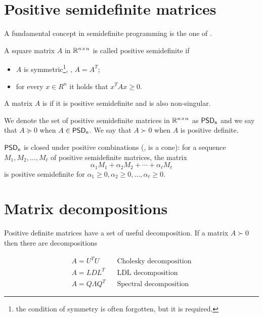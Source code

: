 \documentclass[a4paper,twoside,justified]{tufte-handout}
\begin{document}
 

\section{Positive semidefinite matrices}

A fundamental concept in semidefinite programming is the one of
. 
\begin{definition}
  A square matrix $A$ in $ \mathbb{R}^{n\times n} $ is called positive
  semidefinite if 
  \begin{itemize}
    \item $A$ is symmetric\footnote{the condition of symmetry is often
      forgotten, but it is required.}, \ie, $ A=A^{T} $;
    \item for every $ x\in R^{n} $ it holds that $ x^{T} A x \geq 0 $.
  \end{itemize}
  A matrix $ A $ is  if it is
  positive semidefinite and is also non-singular.
\end{definition}
We denote the set of positive semidefinite matrices in $\mathbb{R}^{n\times
  n}$ as $\mathsf{PSD_{n}}$ and we say that $ A\succeq 0$ when $ A
\in \mathsf{PSD_{n}} $. We say that $ A \succ 0 $ when $ A $ is
positive definite.

\begin{fact}
  $ \mathsf{PSD_{n}} $ is closed under positive
  combinations (\ie, is a cone): for a sequence $ M_{1}, M_{2}, \ldots, M_{\ell} $ of positive
  semidefinite matrices, the matrix 
\begin{equation}
  \alpha_{1} M_{1} + \alpha_{2} M_{2} + \cdots + \alpha_{\ell} M_{\ell}
\end{equation}
is positive semidefinite for $ \alpha_{1}\geq 0, \alpha_{2}\geq 0,
\ldots , \alpha_{\ell} \geq 0$.
\end{fact}

\section{Matrix decompositions}


Positive definite matrices have a set of useful decomposition. If a
matrix $ A \succ 0 $ then there are decompositions

\begin{align}
  A = U^{T}U & & \text{Cholesky decomposition}\\
  A = L D L^{T} & & \text{LDL decomposition}\\
  A = Q \Lambda Q^{T} & & \text{Spectral decomposition}
\end{align}
\end{document}
